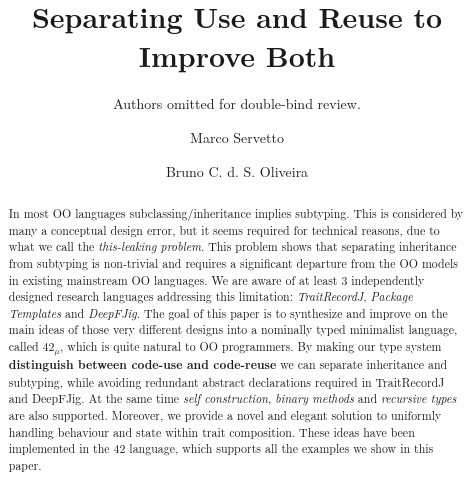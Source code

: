 \documentclass[a4paper,UKenglish]{lipics-v2016}
\title{Separating Use and Reuse to Improve Both}
\author{Authors omitted for double-bind review.}
\author{Marco Servetto\inst{1} \and Bruno C. d. S. Oliveira\inst{2}}
\institute{Victoria University of Wellington, New Zealand,\\
\and
The University of Hong Kong, Hong Kong\\}
\theoremstyle{plain}
\newcommand\saveSpace{}
\newcommand\name{{\bf $42_{\mu}$}\xspace}
\begin{document}
\maketitle

\begin{abstract}
\saveSpace\saveSpace\saveSpace
In most OO languages subclassing/inheritance implies
subtyping. This is considered by many a conceptual design error, but it
seems required for technical reasons, due to what we call the
\emph{this-leaking problem}. This problem shows that separating
inheritance from subtyping is non-trivial and requires a significant
departure from the OO models in existing mainstream OO languages.
We are aware of at least 3 independently designed research languages 
addressing this limitation: \emph{TraitRecordJ}, \emph{Package Templates} and \emph{DeepFJig}.
The goal of this paper is to synthesize and improve on
the main ideas of those very different designs into a nominally typed
minimalist language, called \name, which is quite
natural to OO programmers.
By making our type system \textbf{distinguish between code-use and code-reuse}
we can separate inheritance and subtyping, while avoiding 
redundant abstract declarations required in TraitRecordJ and
DeepFJig. At the same time \emph{self construction},
\emph{binary methods} and \emph{recursive types} are also supported.
Moreover, we provide a novel and elegant solution to uniformly
handling behaviour and state within trait composition.
These ideas have been implemented in the 42 language, 
which supports all the examples we show in this paper.
\saveSpace\saveSpace\saveSpace

\saveSpace\saveSpace\saveSpace
\end{abstract}


















\end{document}
